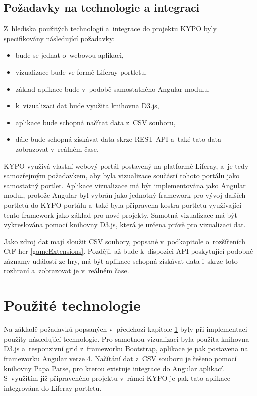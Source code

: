 \documentclass[
  digital, %
  oneside, %
  table,   %
  nolof,     %
  nolot,     %
  nocover
]{fithesis3}
\begin{document}
\section{Požadavky na technologie a integraci} \label{technologyRequirements}
Z~hlediska použitých technologií a~integrace do projektu KYPO byly specifikovány následující požadavky:
\begin{itemize}
  \item bude se jednat o~webovou aplikaci,
  \item vizualizace bude ve formě Liferay portletu,
  \item základ aplikace bude v~podobě samostatného Angular modulu,
  \item k~vizualizaci dat bude využita knihovna D3.js,
  \item aplikace bude schopná načítat data z~CSV souboru,
  \item dále bude schopná získávat data skrze REST API a~také tato data zobrazovat v~reálném čase.
\end{itemize}
KYPO využívá vlastní webový portál postavený na platformě Liferay, a~je tedy samozřejmým požadavkem, aby byla vizualizace součástí tohoto portálu jako samostatný portlet. Aplikace vizualizace má být implementována jako Angular modul, protože Angular byl vybrán jako jednotný framework pro vývoj dalších portletů do KYPO portálu a~také byla připravena kostra portletu využívající tento framework jako základ pro nové projekty. Samotná vizualizace má být vykreslována pomocí knihovny D3.js, která je určena právě pro vizualizaci dat.\par
Jako zdroj dat mají sloužit CSV soubory, popsané v~podkapitole o~rozšířeních CtF her \ref{gameExtensions}. Později, až bude k~dispozici API poskytující podobné záznamy událostí ze hry, má být aplikace schopná získávat data i~skrze toto rozhraní a~zobrazovat je v~reálném čase.

\chapter{Použité technologie}
Na základě požadavků popsaných v~předchozí kapitole \ref{technologyRequirements} byly při implementaci použity následující technologie. Pro samotnou vizualizaci byla použita knihovna D3.js a~responzivní grid z~frameworku Bootstrap, aplikace je pak postavena na frameworku Angular verze 4. Načítání dat z~CSV souboru je řešeno pomocí knihovny Papa Parse, pro kterou existuje integrace do Angular aplikací. S~využitím již připraveného projektu v~rámci KYPO je pak tato aplikace integrována do Liferay portletu.
\end{document}
